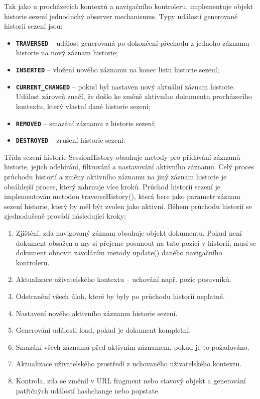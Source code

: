 Tak jako u procházecích kontextů a navigačního kontroleru, implementuje objekt historie sezení jednoduchý observer mechanismus. Typy událostí generované historií sezení jsou:

\begin{itemize}
  \item \textbf{\texttt{TRAVERSED}} -- událost generovaná po dokončení přechodu z jednoho záznamu historie na nový záznam historie;
  \item \textbf{\texttt{INSERTED}} -- vložení nového záznamu na konec listu historie sezení;
  \item \textbf{\texttt{CURRENT\_CHANGED}} -- pokud byl nastaven nový aktuální záznam historie. Událost zároveň značí, že došlo ke změně aktivního dokumentu procházecího kontextu, který vlastní dané historie sezení; 
  \item \textbf{\texttt{REMOVED}} -- smazání záznamu z historie sezení;
  \item \textbf{\texttt{DESTROYED}} -- zrušení historie sezení.
\end{itemize}

Třída sezení historie SessionHistory obsahuje metody pro přidávání záznamů historie, jejich odebírání, filtrování a nastavování aktivního záznamu. Celý proces průchodu historií a změny aktivního záznamu na jiný záznam historie je obsáhlejší proces, který zahrnuje více kroků. Průchod historií sezení je implementován metodou traverseHistory(), která bere jako parametr záznam sezení historie, který by měl být zvolen jako aktivní. Během průchodu historií se zjednodušeně provádí následující kroky:

\begin{enumerate}
  \item Zjištění, zda navigovaný záznam obsahuje objekt dokumentu. Pokud není dokument obsažen a my si přejeme posunout na tuto pozici v historii, musí se dokument obnovit zavoláním metody update() daného navigačního kontroleru.
  \item Aktualizace uživatelského kontextu -- uchování např. pozic posuvníků.
  \item Odstranění všech úloh, které by byly po průchodu historií neplatné.
  \item Nastavení nového aktivního záznamu historie sezení.
  \item Generování události load, pokud je dokument kompletní.
  \item Smazání všech záznamů před aktivním záznamem, pokud je to požadováno.
  \item Aktualizace uživatelského prostředí z uchovaného uživatelského kontextu.
  \item Kontrola, zda se změnil v URL fragment nebo stavový objekt a generování patřičných událostí hashchange nebo popstate.
\end{enumerate}


